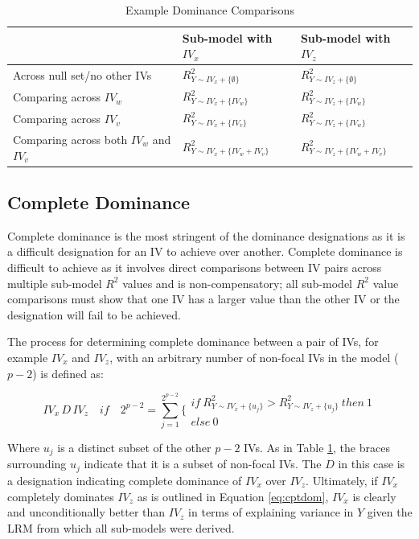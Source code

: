\documentclass[doc]{apa7}
\begin{document}
		\begin{table}[h!]
			\centering
			\caption{\centering Example Dominance Comparisons}
			\begin{tabular}{ l | l l }
				
				& Sub-model with $IV_x$ & Sub-model with $IV_z$ \\
				\hline
				Across null set/no other IVs & $R^2_{Y \sim IV_x + \{\emptyset\}}$ & $R^2_{Y \sim IV_z+ \{\emptyset\} }$ \\
				Comparing across $IV_w$ & $R^2_{Y \sim IV_x + \{IV_w\}}$ & $R^2_{Y \sim IV_z + \{IV_w\}}$ \\
				Comparing across $IV_v$ & $R^2_{Y \sim IV_x + \{IV_v\}}$ & $R^2_{Y \sim IV_z + \{IV_w\}}$ \\
				Comparing across both $IV_w$ and $IV_v$ & $R^2_{Y \sim IV_x + \{IV_w + IV_v\}}$ & $R^2_{Y \sim IV_z + \{IV_w + IV_v\}}$ \\
				\hline
		\end{tabular}
		\label{tab:exdom}
	\end{table}
	
	\subsection{Complete Dominance}
	
	Complete dominance is the most stringent of the dominance designations as it is a difficult designation for an IV to achieve over another.
	Complete dominance is difficult to achieve as it involves direct comparisons between IV pairs across multiple sub-model $R^2$ values and is non-compensatory; all sub-model $R^2$ value comparisons must show that one IV has a larger value than the other IV or the designation will fail to be achieved.
	
	The process for determining complete dominance between a pair of IVs, for example $IV_x$ and $IV_z$, with an arbitrary number of non-focal IVs in the model ($p - 2$) is defined as:
	
	\begin{equation}
		IV_x \, D \, IV_z \quad if \quad 2^{p-2} = \sum^{2^{p-2}}_{j=1} \Biggr\{ 
		\begin{array}{l}
			if \ R^2_{Y \sim IV_x + \{u_j\}} > R^2_{Y \sim IV_z + \{u_j\}} \ then \ 1 \\
			else \ 0 
		\end{array}
		\label{eq:cptdom}
	\end{equation}
	
	Where $u_j$ is a distinct subset of the other $p - 2$ IVs.
	As in Table \ref{tab:exdom}, the braces surrounding $u_j$ indicate that it is a subset of non-focal IVs.
	The $D$ in this case is a designation indicating complete dominance of $IV_x$ over $IV_z$.
	Ultimately, if $IV_x$ completely dominates $IV_z$ as is outlined in Equation \ref{eq:cptdom}, $IV_x$ is clearly and unconditionally better than $IV_z$ in terms of explaining variance in $Y$ given the LRM from which all sub-models were derived.	
	
\end{document}
